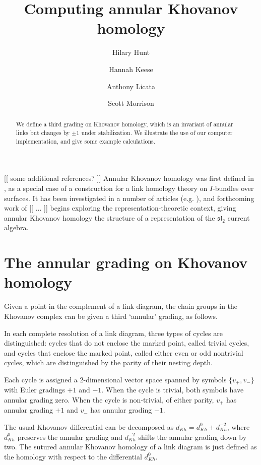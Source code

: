 \documentclass{amsart}
\title{Computing annular Khovanov homology}
\author{Hilary Hunt}
\author{Hannah Keese}
\author{Anthony Licata}
\author{Scott Morrison}
\theoremstyle{plain}
\newcommand{\nn}[1]{{\color{red} [[ #1 ]]}}
\begin{document}
\begin{abstract}
We define a third grading on Khovanov homology, which is an invariant of annular links but changes by $\pm 1$ under stabilization. We illustrate the use of our computer implementation, and give some example calculations.
\end{abstract}

\maketitle

\nn{ some additional references? }
Annular Khovanov homology was first defined in \cite{MR2113902}, as a special case of a construction for a link homology theory on $I$-bundles over surfaces. It has been investigated in a number of articles (e.g. \cite{MR2728482, MR3147412, MR2866927, 1212.2222, 1303.1986, 1305.2183}), and forthcoming work of \nn{ ... } begins exploring the representation-theoretic context, giving annular Khovanov homology the structure of a representation of the $\mathfrak{sl}_2$ current algebra.


\section{The annular grading on Khovanov homology}
Given a point in the complement of a link diagram, the chain groups in the Khovanov complex can be given a third `annular' grading, as follows.

In each complete resolution of a link diagram, three types of cycles are distinguished: cycles that do not enclose the marked point, called trivial cycles, and cycles that enclose the marked point, called either even or odd nontrivial cycles, which are distinguished by the parity of their nesting depth.

Each cycle is assigned a 2-dimensional vector space spanned by symbols $\{v_+, v_-\}$ with Euler gradings $+1$ and $-1$. When the cycle is trivial, both symbols have annular grading zero. When the cycle is non-trivial, of either parity, $v_+$ has annular grading $+1$ and $v_-$ has annular grading $-1$.

The usual Khovanov differential can be decomposed as $d_{Kh}=d_{Kh}^0+d_{Kh}^{-2}$, where $d_{Kh}^0$ preserves the annular grading and $d_{Kh}^{-2}$ shifts the annular grading down by two. The  sutured annular Khovanov homology of a link diagram is just defined as the homology with respect to the differential $d_{Kh}^0$.
\end{document}
